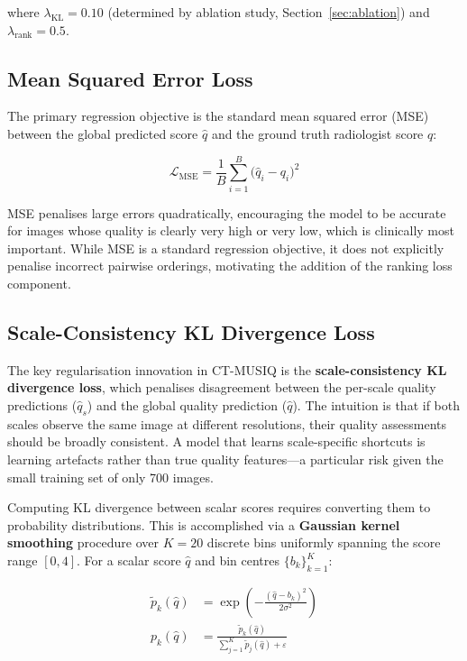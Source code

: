 where $\lambda_{\text{KL}} = 0.10$ (determined by ablation study, Section~\ref{sec:ablation})
and $\lambda_{\text{rank}} = 0.5$.

\subsection{Mean Squared Error Loss}

The primary regression objective is the standard mean squared error (MSE) between the
global predicted score $\hat{q}$ and the ground truth radiologist score $q$:

\begin{equation}
    \mathcal{L}_{\text{MSE}} = \frac{1}{B} \sum_{i=1}^{B} \bigl(\hat{q}_i - q_i\bigr)^2
    \label{eq:mse_loss}
\end{equation}

MSE penalises large errors quadratically, encouraging the model to be accurate for
images whose quality is clearly very high or very low, which is clinically most important.
While MSE is a standard regression objective, it does not explicitly penalise incorrect
pairwise orderings, motivating the addition of the ranking loss component.

\subsection{Scale-Consistency KL Divergence Loss}

The key regularisation innovation in CT-MUSIQ is the \textbf{scale-consistency KL
divergence loss}, which penalises disagreement between the per-scale quality predictions
($\hat{q}_s$) and the global quality prediction ($\hat{q}$). The intuition is that if
both scales observe the same image at different resolutions, their quality assessments
should be broadly consistent. A model that learns scale-specific shortcuts is learning
artefacts rather than true quality features---a particular risk given the small training
set of only 700 images.

Computing KL divergence between scalar scores requires converting them to probability
distributions. This is accomplished via a \textbf{Gaussian kernel smoothing} procedure
over $K = 20$ discrete bins uniformly spanning the score range $[0, 4]$. For a scalar
score $\hat{q}$ and bin centres $\{b_k\}_{k=1}^{K}$:

\begin{align}
    \tilde{p}_k(\hat{q}) &= \exp\!\left(-\frac{(\hat{q} - b_k)^2}{2\sigma^2}\right)
    \label{eq:gauss_kernel}\\
    p_k(\hat{q})          &= \frac{\tilde{p}_k(\hat{q})}{\displaystyle\sum_{j=1}^{K}
                             \tilde{p}_j(\hat{q}) + \varepsilon}
    \label{eq:soft_dist}
\end{align}

